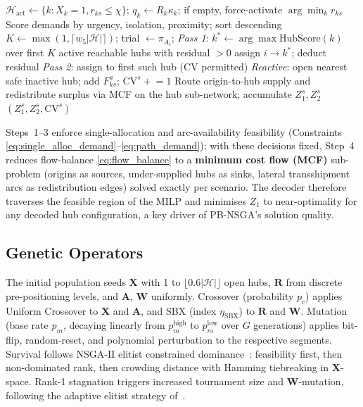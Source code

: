 \documentclass{llncs}
\begin{document}
\begin{algorithm}[htbp]
\caption{Priority-Based Decoder (single scenario $s$)}
\label{alg:decoder}
\small
\begin{algorithmic}[1]
\State $\mathcal{H}_{\text{act}}\!\leftarrow\!\{k:X_k\!=\!1,r_{ks}\!\le\!\chi\}$; $q_k\!\leftarrow\!R_k\kappa_k$; if empty, force-activate $\arg\min_k r_{ks}$
\State Score demands by urgency, isolation, proximity; sort descending
    \State $K\!\leftarrow\!\max(1,\lceil w_5|\mathcal{H}|\rceil)$;\; trial $\leftarrow\pi_{A_i}$;\; \textit{Pass 1}: $k^*\!\leftarrow\!\arg\max\text{HubScore}(k)$ over first $K$ active reachable hubs with residual $>0$
     assign $i\!\to\!k^*$; deduct residual
     \textit{Pass 2}: assign to first such hub (CV permitted)
    \Else{} \textit{Reactive}: open nearest safe inactive hub; add $F^a_{ks}$; $\text{CV}^s\!\mathrel{+}=\!1$
    \EndIf
\EndFor
\State Route origin-to-hub supply and redistribute surplus via MCF on the hub sub-network; accumulate $Z_1^s,Z_2^s$
\State \Return $(Z_1^s,Z_2^s,\text{CV}^s)$
\end{algorithmic}
\end{algorithm}

Steps~1--3 enforce single-allocation and arc-availability feasibility (Constraints \eqref{eq:single_alloc_demand}--\eqref{eq:path_demand}); with these decisions fixed, Step~4 reduces flow-balance \eqref{eq:flow_balance} to a \textbf{minimum cost flow (MCF)} sub-problem (origins as sources, under-supplied hubs as sinks, lateral transshipment arcs as redistribution edges) solved exactly per scenario. The decoder therefore traverses the feasible region of the MILP and minimises $Z_1$ to near-optimality for any decoded hub configuration, a key driver of PB-NSGA's solution quality.

\subsection{Genetic Operators}
The initial population seeds $\mathbf{X}$ with 1 to $\lfloor 0.6|\mathcal{H}|\rfloor$ open hubs, $\mathbf{R}$ from discrete pre-positioning levels, and $\mathbf{A}$, $\mathbf{W}$ uniformly. Crossover (probability $p_c$) applies Uniform Crossover to $\mathbf{X}$ and $\mathbf{A}$, and SBX (index $\eta_{\mathrm{SBX}}$) to $\mathbf{R}$ and $\mathbf{W}$. Mutation (base rate $p_m$, decaying linearly from $p_m^{\mathrm{high}}$ to $p_m^{\mathrm{low}}$ over $G$ generations) applies bit-flip, random-reset, and polynomial perturbation to the respective segments. Survival follows NSGA-II elitist constrained dominance~\cite{deb2002fast}: feasibility first, then non-dominated rank, then crowding distance with Hamming tiebreaking in $\mathbf{X}$-space. Rank-1 stagnation triggers increased tournament size and $\mathbf{W}$-mutation, following the adaptive elitist strategy of~\cite{liang2011genetic}.
\end{document}

